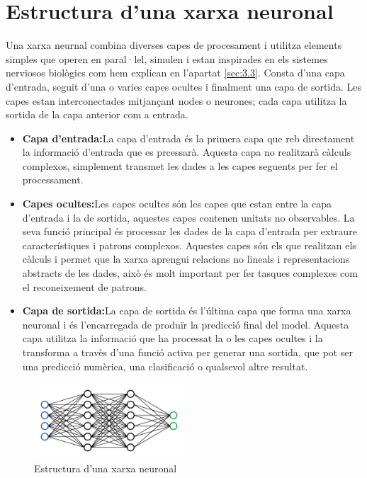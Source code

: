 \section{Estructura d'una xarxa neuronal}
Una xarxa neurnal combina diverses capes de procesament i utilitza elements simples que operen en paral·lel, simulen i estan inspirades en els sistemes nerviosos biològics com hem explican en l'apartat \ref{sec:3.3}. Consta d'una capa d'entrada, seguit d'una o varies capes ocultes i finalment una capa de sortida. Les capes estan interconectades mitjançant nodes o neurones; cada capa utilitza la sortida de la capa anterior com a entrada.
\begin{itemize}
 \item \textbf{Capa d'entrada:}La capa d'entrada és la primera capa que reb directament la informació d'entrada que es prcessarà. Aquesta capa no realitzarà càlculs complexos, simplement transmet les dades a les capes seguents per fer el processament.
 \item \textbf{Capes ocultes:}Les capes ocultes són les capes que estan entre la capa d'entrada i la de sortida, aquestes capes contenen unitats no observables. La seva funció principal és processar les dades de la capa d'entrada per extraure característiques i patrons complexos. Aquestes capes són els que realitzan els càlculs i permet que la xarxa aprengui relacions no lineals i representacions abstracts de les dades, això és molt important per fer tasques complexes com el reconeixement de patrons.
 \item \textbf{Capa de sortida:}La capa de sortida és l'última capa que forma una xarxa neuronal i és l'encarregada de produïr la predicció final del model. Aquesta capa utilitza la informació que ha processat la o les capes ocultes i la transforma a travès d'una funció activa per generar una sortida, que pot ser una predicció numèrica, una clasificació o qualsevol altre resultat.
\end{itemize}
\begin{figure}[h!]
    \centering
    \includegraphics[width=0.5\textwidth]{./figures/xarxa.png}
    \caption{Estructura d'una xarxa neuronal}
\end{figure}%

